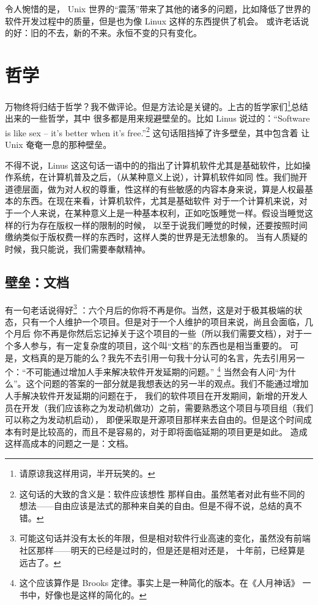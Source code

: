 \documentclass{ctexart}
\begin{document}
    令人惋惜的是， Unix 世界的“震荡”带来了其他的诸多的问题，比如降低了世界的软件开发过程中的质量，但是也为像 Linux 这样的东西提供了机会。
    或许老话说的好：旧的不去，新的不来。永恒不变的只有变化。

    \section{哲学}
    万物终将归结于哲学？我不做评论。但是方法论是关键的。上古的哲学家们\footnote{请原谅我这样用词，半开玩笑的。}总结出来的一些哲学，其中
    很多都是用来规避壁垒的。比如 Linus 说过的：“Software is like sex -- it's better when it's free.”\footnote{这句话的大致的含义是：软件应该想性
    那样自由。虽然笔者对此有些不同的想法——自由应该是法式的那种来自美的自由。但是不得不说，总结的真不错。} 这句话阻挡掉了许多壁垒，其中包含着 让
    Unix 奄奄一息的那种壁垒。

    不得不说，Linus 这这句话一语中的的指出了计算机软件尤其是基础软件，比如操作系统，在计算机普及之后，（从某种意义上说），计算机软件如同
    性。我们抛开道德层面，做为对人权的尊重，性这样的有些敏感的内容本身来说，算是人权最基本的东西。在现在来看，计算机软件，尤其是基础软件
    对于一个计算机来说，对于一个人来说，在某种意义上是一种基本权利，正如吃饭睡觉一样。假设当睡觉这样的行为存在版权一样的限制的时候，
    以至于说我们睡觉的时候，还要按照时间缴纳类似于版权费一样的东西时，这样人类的世界是无法想象的。
    当有人质疑的时候，我只能说，我们需要奉献精神。
    
    \subsection{壁垒：文档}
    有一句老话说得好\footnote{可能这句话并没有太长的年限，但是相对软件行业高速的变化，虽然没有前端社区那样——明天的已经是过时的，但是还是相对还是，
        十年前，已经算是远古了。}
    ：六个月后的你将不再是你。当然，这是对于极其极端的状态，只有一个人维护一个项目。但是对于一个人维护的项目来说，尚且会面临，几个月后
    你不再是你然后忘记掉关于这个项目的一些（所以我们需要文档），对于一个多人参与，有一定复杂度的项目，这个叫“文档”的东西也是相当重要的。
    可是，文档真的是万能的么？我先不去引用一句我十分认可的名言，先去引用另一个：“不可能通过增加人手来解决软件开发延期的问题。”
    \footnote{这个应该算作是 Brooks 定律。事实上是一种简化的版本。在《人月神话》 一书中，好像也是这样的简化的。}
    当然会有人问“为什么”。这个问题的答案的一部分就是我想表达的另一半的观点。我们不能通过增加人手解决软件开发延期的问题在于，
    我们的软件项目在开发期间，新增的开发人员在开发（我们应该称之为发动机做功）之前，需要熟悉这个项目与项目组（我们可以称之为发动机启动），
    即便采取是开源项目那样来去自由的。但是这个时间成本有时是比较高的，而且不是容易的，对于即将面临延期的项目更是如此。
    造成这样高成本的问题之一是：文档。
\end{document}
